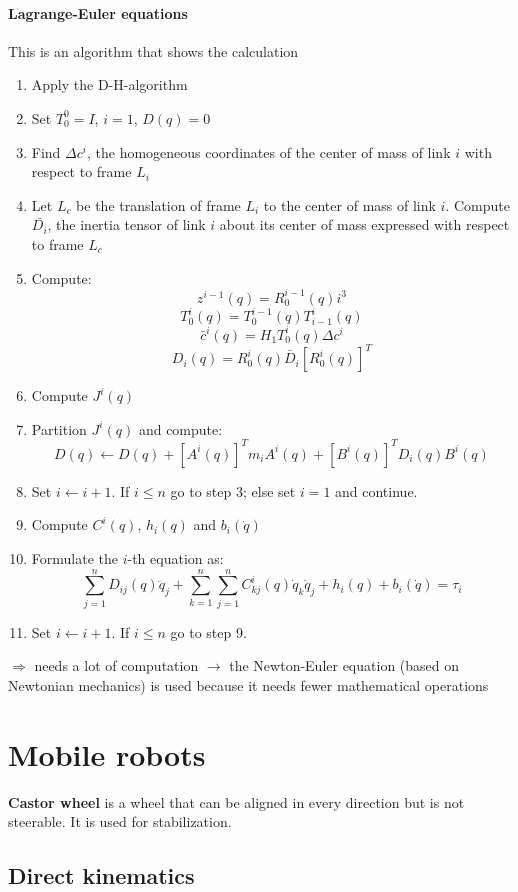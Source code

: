 \documentclass[12pt]{article}
\begin{document}
	\paragraph{Lagrange-Euler equations} This is an algorithm that shows the calculation
	\begin{enumerate}
		\item Apply the D-H-algorithm
		\item Set $T^0_0 = I$, $i = 1$, $D(q) = 0$
		\item Find $\Delta c^i$, the homogeneous coordinates of the center of mass of link $i$ with respect to frame $L_i$
		\item Let $L_c$ be the translation of frame $L_i$ to the center of mass of link $i$. Compute $\bar{D_i}$, the inertia tensor of link $i$ about its center of mass expressed with respect to frame $L_c$
		\item Compute: $$z^{i-1}(q) = R^{i-1}_0(q) i^3$$
		$$T^i_0(q) = T^{i-1}_0(q)T^i_{i-1}(q)$$
		$$\bar{c}^i(q) = H_1 T^i_0(q) \Delta c^i$$
		$$D_i(q) = R^i_0(q) \bar{D}_i [R^i_0(q)]^T$$
		\item Compute $J^i(q)$
		\item Partition $J^i(q)$ and compute: $$D(q) \leftarrow D(q) + [A^i(q)]^T m_i A^i(q) + [B^i(q)]^T D_i(q) B^i(q)$$
		\item Set $i \leftarrow i + 1$. If $i \leq n$ go to step 3; else set $i = 1$ and continue.
		\item Compute $C^i(q)$, $h_i(q)$ and $b_i(\dot{q})$
		\item Formulate the $i$-th equation as:
		$$ \sum_{j=1}^n D_{ij}(q) \ddot{q}_j + \sum_{k=1}^{n} \sum_{j=1}^{n} C^i_{kj}(q) \dot{q}_k \dot{q}_j + h_i(q) + b_i(\dot{q}) = \tau_i $$
		\item Set $i \leftarrow i + 1$. If $i \leq n$ go to step 9.
	\end{enumerate}
	$\Rightarrow$ needs a lot of computation $\rightarrow$ the Newton-Euler equation (based on Newtonian mechanics) is used because it needs fewer mathematical operations

	
	\section{Mobile robots}
	\textbf{Castor wheel} is a wheel that can be aligned in every direction but is not steerable. It is used for stabilization.
	\subsection{Direct kinematics}
\end{document}
